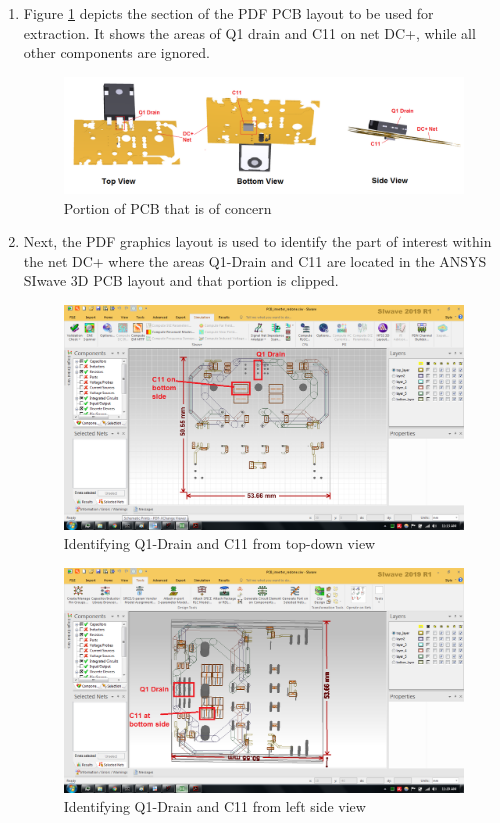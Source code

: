 \begin{enumerate}
\item Figure \ref{fig:PCB_cut1} depicts the section of the PDF PCB layout to be used for extraction. It shows the areas of Q1 drain and C11 on net DC+, while all other components are ignored. 

\begin{figure} [H]
  \centering
  \includegraphics[width=\linewidth]{pictures/examples/PCB_cut_1.png}
  \caption{Portion of PCB that is of concern}
  \label{fig:PCB_cut1}
\end{figure}

\item Next, the PDF graphics layout is used to identify the part of interest within the net DC+ where the areas Q1-Drain and C11 are located in the ANSYS SIwave 3D PCB layout and that portion is clipped.

\begin{figure} [H]
  \centering
  \includegraphics[width=\linewidth]{pictures/examples/siwave_td.png}
  \caption{Identifying Q1-Drain and C11 from top-down view}
  \label{fig:PCB_identify1}
\end{figure}

\begin{figure} [H]
  \centering
  \includegraphics[width=\linewidth]{pictures/examples/siwave_ls.png}
  \caption{Identifying Q1-Drain and C11 from left side view}
  \label{fig:PCB_clip1}
\end{figure}


\end{enumerate}
